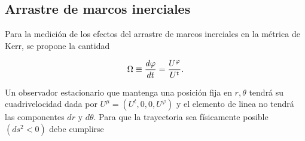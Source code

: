 


\subsection{Arrastre de marcos inerciales}

Para la medición de los efectos del arrastre de marcos inerciales en la métrica de Kerr, se propone la cantidad

\begin{equation}
    \Omega \equiv \frac{d \varphi}{d t}=\frac{U^{\varphi}}{U^t}.
\end{equation}

Un observador estacionario que mantenga una posición fija en $r,\theta$ tendrá su cuadrivelocidad dada por  $U^\mu=\left(U^t, 0,0, U^{\varphi}\right)$ y el elemento de linea no tendrá las componentes $dr$ y $d\theta$.
Para que la trayectoria sea físicamente posible $\left(d s^2<0\right)$ debe cumplirse

